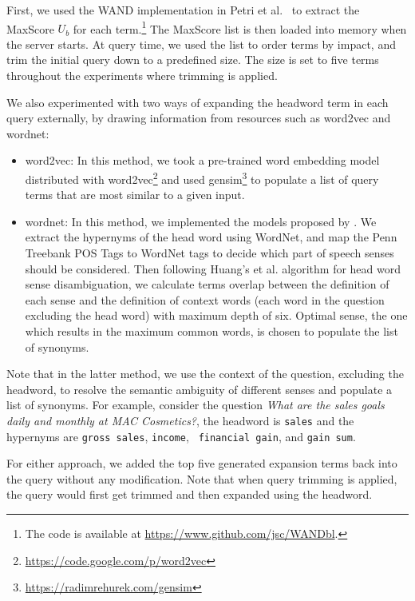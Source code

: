 \documentclass[a4paper,10pt,conference,compsocconf,final]{IEEEtran}
\newcommand\method[1]{{\sf\small{#1}}}
\begin{document}
{{{{First, we used the WAND implementation in Petri et
al.~\cite{petri2013exploring,petri2014score} to extract the MaxScore
$U_b$ for each term.\footnote{The code is available at
\url{https://www.github.com/jsc/WANDbl}.}
The MaxScore list is then loaded into memory when the server starts.
At query time, we used the list to order terms by impact, and trim the
initial query down to a predefined size.
The size is set to five terms throughout the experiments where trimming
is applied.

We also experimented with two ways of expanding the headword term in
each query externally, by drawing information from resources such as
\method{word2vec} and \method{wordnet}:

\begin{itemize}
  \item \method{word2vec}:  
    In this method, we took a pre-trained word
    embedding model distributed with
    \method{word2vec}\footnote{\url{https://code.google.com/p/word2vec}} and
    used \method{gensim}\footnote{\url{https://radimrehurek.com/gensim}} to
    populate a list of query terms that are most similar to a given input.  

  \item \method{wordnet}: In this method, we implemented the models proposed by
    \cite{huang2008question, silva2011symbolic}.  We extract the hypernyms of
    the head word using WordNet, and map the Penn Treebank POS Tags to WordNet
    tags to decide which part of speech senses should be considered.  Then
    following Huang's et al.  \cite{huang2008question} algorithm for head word
    sense disambiguation, we calculate terms overlap between the definition of
    each sense and the definition of context words (each word in the question
    excluding the head word) with maximum depth of six. Optimal sense, the one
    which results in the maximum common words, is chosen to populate the list
    of synonyms.  
\end{itemize}

Note that in the latter method, we use the context of the question, excluding
the headword, to resolve the semantic ambiguity of different senses and
populate a list of synonyms.  For example, consider the question \textit{What
are the sales goals daily and monthly at MAC Cosmetics?}, the headword is
{\tt sales} and the hypernyms are {\tt gross sales}, {\tt income}, {\tt
financial gain}, and {\tt gain sum}.

For either approach, we added the top five generated expansion terms back into
the query without any modification.  Note that when query trimming is applied,
the query would first get trimmed and then expanded using the headword.

}}}}
\end{document}
